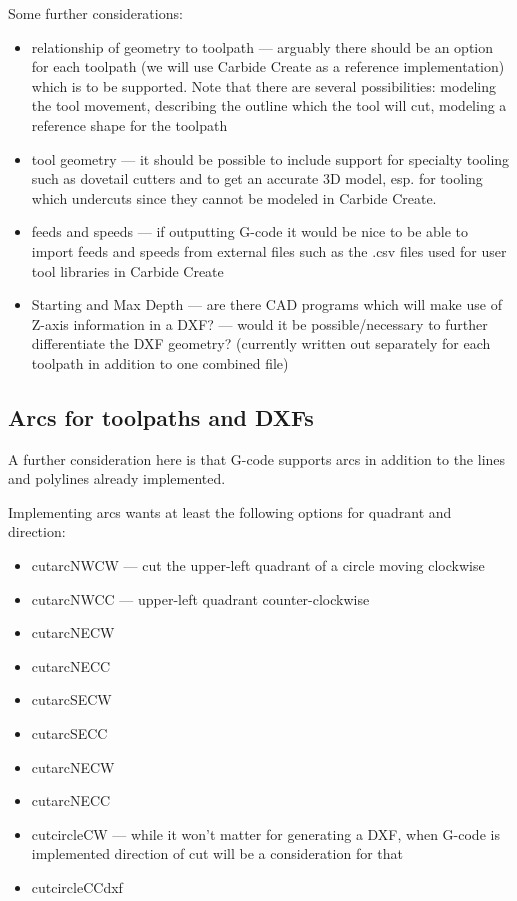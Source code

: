 \documentclass{ltxdoc}
\begin{document}
Some further considerations:

\begin{itemize}
 \item relationship of geometry to toolpath --- arguably there should be an option for each
       toolpath (we will use Carbide Create as a reference implementation) which is to be 
       supported. Note that there are several possibilities: modeling the tool movement,
       describing the outline which the tool will cut, modeling a reference shape for the toolpath
 \item tool geometry --- it should be possible to include support for specialty tooling 
       such as dovetail cutters and to get an accurate 3D model, esp. for tooling which
       undercuts since they cannot be modeled in Carbide Create.
 \item feeds and speeds --- if outputting G-code it would be nice to be able to import feeds 
       and speeds from external files such as the .csv files used for user tool libraries in
       Carbide Create
 \item Starting and Max Depth --- are there CAD programs which will make use of Z-axis information 
       in a DXF? --- would it be possible/necessary to further differentiate the DXF geometry?
       (currently  written out separately for each toolpath in addition to one combined file)
\end{itemize}

\subsection{Arcs for toolpaths and DXFs}
 
A further consideration here is that G-code supports arcs in addition to the lines and
polylines already implemented. 

Implementing arcs wants at least the following options for quadrant and direction:
 
\begin{itemize}
\item cutarcNWCW --- cut the upper-left quadrant of a circle moving clockwise
\item cutarcNWCC --- upper-left quadrant counter-clockwise
\item cutarcNECW
\item cutarcNECC
\item cutarcSECW
\item cutarcSECC
\item cutarcNECW
\item cutarcNECC
\item cutcircleCW --- while it won’t matter for generating a DXF, when G-code is implemented
                      direction of cut will be a consideration for that
\item cutcircleCCdxf
\end{itemize}
 
\end{document}
